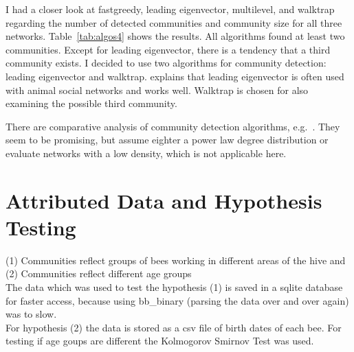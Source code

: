 I had a closer look at fastgreedy, leading eigenvector, multilevel, and walktrap regarding the number of detected communities and community size for all three networks. Table~\ref{tab:algos4} shows the results. All algorithms found at least two communities. Except for leading eigenvector, there is a tendency that a third community exists.
I decided to use two algorithms for community detection: leading eigenvector and walktrap. \textcite{farine2015constructing} explains that leading eigenvector is often used with animal social networks and works well. Walktrap is chosen for also  examining the possible third community.

There are comparative analysis of community detection algorithms, e.g.~\cite{yang2016comparative, harenberg2014community}. They seem to be promising, but assume eighter a power law degree distribution or evaluate networks with a low density, which is not applicable here.




\section{Attributed Data and Hypothesis Testing}
(1) Communities reflect groups of bees working in different areas of the hive and\\
(2) Communities reflect different age groups\\

The data which was used to test the hypothesis (1) is saved in a sqlite database for faster access, because using bb\_binary (parsing the data over and over again) was to slow.\\

For hypothesis (2) the data is stored as a csv file of birth dates of each bee. For testing if age goups are different the Kolmogorov Smirnov Test was used.\\